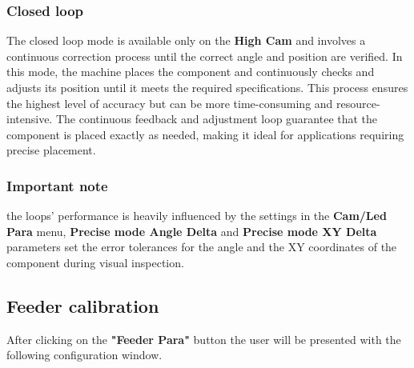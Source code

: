 \documentclass[a4paper,10pt]{report}
\begin{document}
\subsubsection{Closed loop}
The closed loop mode is available only on the \textbf{High Cam} and involves a continuous correction process until the correct angle and position are verified. In this mode, the machine places the component and continuously checks and adjusts its position until it meets the required specifications. This process ensures the highest level of accuracy but can be more time-consuming and resource-intensive. The continuous feedback and adjustment loop guarantee that the component is placed exactly as needed, making it ideal for applications requiring precise placement.
\subsubsection{Important note}
the loops' performance is heavily influenced by the settings in the \textbf{Cam/Led Para} menu, \textbf{Precise mode Angle Delta} and \textbf{Precise mode XY Delta} parameters set the error tolerances for the angle and the XY coordinates of the component during visual inspection.
\newpage
\subsection{Feeder calibration}
After clicking on the \textbf{"Feeder Para"} button the user will be presented with the following configuration window.
\end{document}
